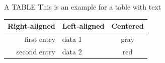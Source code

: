 \documentclass[11pt, aspectratio=169]{beamer}
\begin{document}
\begin{frame}{\MakeUppercase{A table}}
\centering
This is an example for a table with text
\bigskip


\begin{tabular}{rlc}
\toprule
Right-aligned & Left-aligned & Centered\\
\midrule
first entry & data 1 & gray \\
second entry & data 2 & red\\
\bottomrule
\end{tabular}
\end{frame}
\end{document}
